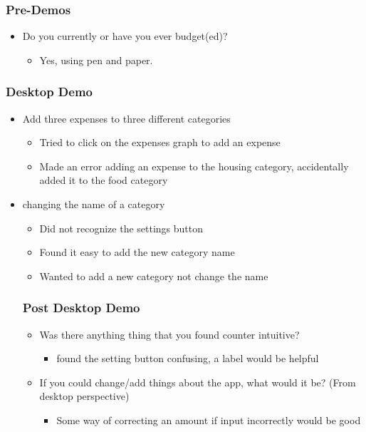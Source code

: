 \documentclass{chi2011}
\begin{document}
	\subsubsection{Pre-Demos}
	\begin{itemize}[noitemsep]
		\item Do you currently or have you ever budget(ed)?
		\begin{itemize}[noitemsep]
			\item 
				Yes, using pen and paper.
		\end{itemize}
	\end{itemize}
	
	\subsubsection{Desktop Demo}
	\begin{itemize}[noitemsep] 
		\item Add three expenses to three different categories
		\begin{itemize}[noitemsep]
				\item Tried to click on the expenses graph to add an expense
				\item Made an error adding an expense to the housing category,
					accidentally added it to the food category
		\end{itemize}
		\item changing the name of a category
			\begin{itemize}[noitemsep]
				\item Did not recognize the settings button
				\item Found it easy to add the new category name
				\item Wanted to add a new category not change the name
	\end{itemize}
	
	\subsubsection{Post Desktop Demo}
	\begin{itemize}[noitemsep]
		\item Was there anything thing that you found counter intuitive?
		\begin{itemize}[noitemsep]
				\item found the setting button confusing, a label would be
					helpful
		\end{itemize}
		\item If you could change/add things about the app, what would it be? (From desktop perspective)
		\begin{itemize}[noitemsep]
				\item Some way of correcting an amount if input incorrectly
					would be good
		\end{itemize}
	\end{itemize}
	

\end{itemize}
\end{document}
